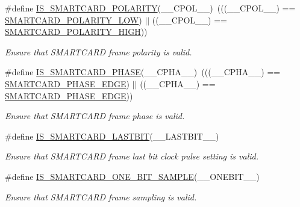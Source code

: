 \begin{DoxyCompactItemize}
\#define \hyperlink{group___s_m_a_r_t_c_a_r_d___private___macros_gae6e80e38ba53dcae1ab065b8f5e3cf0b}{I\+S\+\_\+\+S\+M\+A\+R\+T\+C\+A\+R\+D\+\_\+\+P\+O\+L\+A\+R\+I\+TY}(\+\_\+\+\_\+\+C\+P\+O\+L\+\_\+\+\_\+)~(((\+\_\+\+\_\+\+C\+P\+O\+L\+\_\+\+\_\+) == \hyperlink{group___s_m_a_r_t_c_a_r_d___clock___polarity_ga07e246426d125fbc19f8e363f09b21e5}{S\+M\+A\+R\+T\+C\+A\+R\+D\+\_\+\+P\+O\+L\+A\+R\+I\+T\+Y\+\_\+\+L\+OW}) $\vert$$\vert$ ((\+\_\+\+\_\+\+C\+P\+O\+L\+\_\+\+\_\+) == \hyperlink{group___s_m_a_r_t_c_a_r_d___clock___polarity_ga69e81ca7759a40f9e13c4051fe44a95f}{S\+M\+A\+R\+T\+C\+A\+R\+D\+\_\+\+P\+O\+L\+A\+R\+I\+T\+Y\+\_\+\+H\+I\+GH}))
\begin{DoxyCompactList}\small\item\em Ensure that S\+M\+A\+R\+T\+C\+A\+RD frame polarity is valid. \end{DoxyCompactList}\item 
\#define \hyperlink{group___s_m_a_r_t_c_a_r_d___private___macros_gac402d0ff344e9a8320e5e87f7da5ead5}{I\+S\+\_\+\+S\+M\+A\+R\+T\+C\+A\+R\+D\+\_\+\+P\+H\+A\+SE}(\+\_\+\+\_\+\+C\+P\+H\+A\+\_\+\+\_\+)~(((\+\_\+\+\_\+\+C\+P\+H\+A\+\_\+\+\_\+) == \hyperlink{group___s_m_a_r_t_c_a_r_d___clock___phase_ga6b5dfd540b22b8a6cbd956688d17cfce}{S\+M\+A\+R\+T\+C\+A\+R\+D\+\_\+\+P\+H\+A\+S\+E\+\_\+E\+D\+GE}) $\vert$$\vert$ ((\+\_\+\+\_\+\+C\+P\+H\+A\+\_\+\+\_\+) == \hyperlink{group___s_m_a_r_t_c_a_r_d___clock___phase_ga744e424283994e4c92a4db8b247582d6}{S\+M\+A\+R\+T\+C\+A\+R\+D\+\_\+\+P\+H\+A\+S\+E\+\_\+E\+D\+GE}))
\begin{DoxyCompactList}\small\item\em Ensure that S\+M\+A\+R\+T\+C\+A\+RD frame phase is valid. \end{DoxyCompactList}\item 
\#define \hyperlink{group___s_m_a_r_t_c_a_r_d___private___macros_gad5133b1e345f9601e8a2f05fcf8004c0}{I\+S\+\_\+\+S\+M\+A\+R\+T\+C\+A\+R\+D\+\_\+\+L\+A\+S\+T\+B\+IT}(\+\_\+\+\_\+\+L\+A\+S\+T\+B\+I\+T\+\_\+\+\_\+)
\begin{DoxyCompactList}\small\item\em Ensure that S\+M\+A\+R\+T\+C\+A\+RD frame last bit clock pulse setting is valid. \end{DoxyCompactList}\item 
\#define \hyperlink{group___s_m_a_r_t_c_a_r_d___private___macros_ga101d1102ec58ebd00aef25f285898622}{I\+S\+\_\+\+S\+M\+A\+R\+T\+C\+A\+R\+D\+\_\+\+O\+N\+E\+\_\+\+B\+I\+T\+\_\+\+S\+A\+M\+P\+LE}(\+\_\+\+\_\+\+O\+N\+E\+B\+I\+T\+\_\+\+\_\+)
\begin{DoxyCompactList}\small\item\em Ensure that S\+M\+A\+R\+T\+C\+A\+RD frame sampling is valid. \end{DoxyCompactList}\item 

\end{DoxyCompactItemize}
